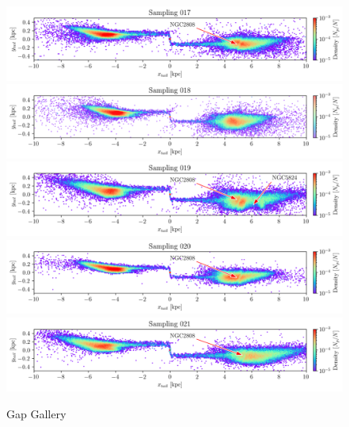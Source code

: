 \documentclass{aa}
\begin{document}
\begin{appendix}
    \begin{figure}
      \centering
      \includegraphics[width=\linewidth]{gallery_of_gaps_monte-carlo-017.png}
      \includegraphics[width=\linewidth]{gallery_of_gaps_monte-carlo-018.png}
      \includegraphics[width=\linewidth]{gallery_of_gaps_monte-carlo-019.png}      
      \includegraphics[width=\linewidth]{gallery_of_gaps_monte-carlo-020.png}
      \includegraphics[width=\linewidth]{gallery_of_gaps_monte-carlo-021.png}
      \caption{Gap Gallery}
      \label{fig:gallery4}
      \end{figure}        


\end{appendix}
\end{document}
